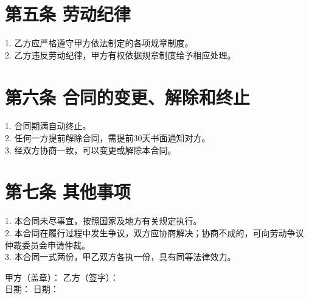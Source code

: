 \documentclass[UTF8]{ctexart}
\begin{document}
\section*{第五条 劳动纪律}
1. 乙方应严格遵守甲方依法制定的各项规章制度。\\
2. 乙方违反劳动纪律，甲方有权依据规章制度给予相应处理。

\section*{第六条 合同的变更、解除和终止}
1. 合同期满自动终止。\\
2. 任何一方提前解除合同，需提前30天书面通知对方。\\
3. 经双方协商一致，可以变更或解除本合同。

\section*{第七条 其他事项}
1. 本合同未尽事宜，按照国家及地方有关规定执行。\\
2. 本合同在履行过程中发生争议，双方应协商解决；协商不成的，可向劳动争议仲裁委员会申请仲裁。\\
3. 本合同一式两份，甲乙双方各执一份，具有同等法律效力。

\vspace{2cm}

\noindent
甲方（盖章）：\underline{\makebox[6cm][l]{\hspace*{0pt}}} \hfill 乙方（签字）：\underline{\makebox[6cm][l]{\hspace*{0pt}}} \\

\noindent
日期：\underline{\makebox[6cm][l]{\hspace*{0pt}}} \hfill 日期：\underline{\makebox[6cm][l]{\hspace*{0pt}}} \\
\end{document}
